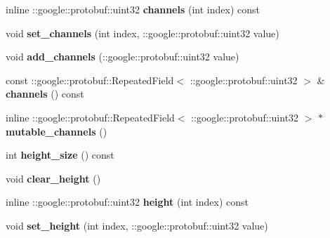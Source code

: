 \begin{DoxyCompactItemize}
\mbox{\label{classcaffe_1_1_dummy_data_parameter_a0ba47b7480ec80b883c716a77bd9d4c3}} 
inline \+::google\+::protobuf\+::uint32 {\bfseries channels} (int index) const
\item 
\mbox{\label{classcaffe_1_1_dummy_data_parameter_a1cf599f4596c1f05355f36b27b1bcf80}} 
void {\bfseries set\+\_\+channels} (int index, \+::google\+::protobuf\+::uint32 value)
\item 
\mbox{\label{classcaffe_1_1_dummy_data_parameter_a167d98c909ab50b933b9646e2eb91a78}} 
void {\bfseries add\+\_\+channels} (\+::google\+::protobuf\+::uint32 value)
\item 
\mbox{\label{classcaffe_1_1_dummy_data_parameter_a6b83468d8e6f2a0e4bb9a8bd6582fd8c}} 
const \+::google\+::protobuf\+::\+Repeated\+Field$<$ \+::google\+::protobuf\+::uint32 $>$ \& {\bfseries channels} () const
\item 
\mbox{\label{classcaffe_1_1_dummy_data_parameter_addc8bd3352dd499108b29ab0f848f9ae}} 
inline \+::google\+::protobuf\+::\+Repeated\+Field$<$ \+::google\+::protobuf\+::uint32 $>$ $\ast$ {\bfseries mutable\+\_\+channels} ()
\item 
\mbox{\label{classcaffe_1_1_dummy_data_parameter_a932350f8631e24715f36b3f81dee2bd4}} 
int {\bfseries height\+\_\+size} () const
\item 
\mbox{\label{classcaffe_1_1_dummy_data_parameter_a08a98d7357cd2ad5a3327ea921ec6be9}} 
void {\bfseries clear\+\_\+height} ()
\item 
\mbox{\label{classcaffe_1_1_dummy_data_parameter_a94f4034044705b831e4da8aaa101ae20}} 
inline \+::google\+::protobuf\+::uint32 {\bfseries height} (int index) const
\item 
\mbox{\label{classcaffe_1_1_dummy_data_parameter_a569f66c6a8309ef0126ceebddc9f8f9f}} 
void {\bfseries set\+\_\+height} (int index, \+::google\+::protobuf\+::uint32 value)

\end{DoxyCompactItemize}
